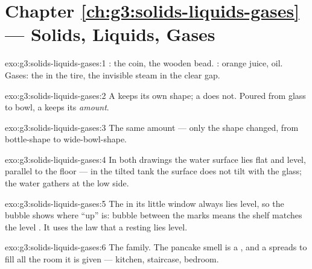 \section*{Chapter \ref{ch:g3:solids-liquids-gases} --- Solids, Liquids, Gases}

\begin{solution}{exo:g3:solids-liquids-gases:1}
: the coin, the wooden bead. : orange juice, oil.
Gases: the  in the tire, the invisible steam in the clear gap.
\end{solution}

\begin{solution}{exo:g3:solids-liquids-gases:2}
A  keeps its own shape; a  does not. Poured from glass to
bowl, a  keeps its \emph{amount}.
\end{solution}

\begin{solution}{exo:g3:solids-liquids-gases:3}
The same amount --- only the shape changed, from bottle-shape to
wide-bowl-shape.
\end{solution}

\begin{solution}{exo:g3:solids-liquids-gases:4}
In both drawings the water surface lies flat and level, parallel to
the floor --- in the tilted tank the surface does not tilt with the
glass; the water gathers at the low side.
\end{solution}

\begin{solution}{exo:g3:solids-liquids-gases:5}
The  in its little window always lies level, so the bubble
shows where ``up'' is: bubble between the marks means the shelf
matches the level . It uses the law that a resting  lies
level.
\end{solution}

\begin{solution}{exo:g3:solids-liquids-gases:6}
The  family. The pancake smell is a , and a  spreads to
fill all the room it is given --- kitchen, staircase, bedroom.
\end{solution}

